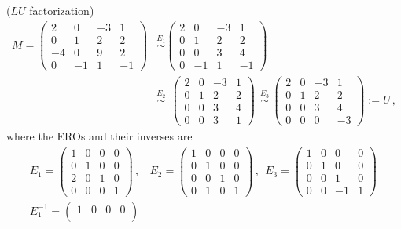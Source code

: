 \begin{example}\label{factorize} ($LU$ \hypertarget{elldeeeww}{ factorization})
\begin{align*}
M=
\begin{pmatrix}
2&0&-3&1\\
0&1&2&2\\
-4&0&9&2\\
0&-1&1&-1
\end{pmatrix}
&\stackrel{E_1}{\sim}
\begin{pmatrix}
2&0&-3&1\\
0&1&2&2\\
0&0&3&4\\
0&-1&1&-1
\end{pmatrix}
\\[2mm]
&\stackrel{E_2}{\sim}
~~\begin{pmatrix}
2&0&-3&1\\
0&1&2&2\\
0&0&3&4\\
0&0&3&1
\end{pmatrix}
~~\stackrel{E_3}{\sim}~
\begin{pmatrix}
2&0&-3&1\\
0&1&2&2\\
0&0&3&4\\
0&0&0&-3
\end{pmatrix}
:=U\, ,
\end{align*}
where the EROs and their inverses are 
\begin{gather*}
E_1=
\begin{pmatrix}
1&0&0&0\\
0&1&0&0\\
2&0&1&0\\
0&0&0&1
\end{pmatrix} \, ,~~~~
E_2=
\begin{pmatrix}
1&0&0&0\\
0&1&0&0\\
0&0&1&0\\
0&1&0&1
\end{pmatrix} \, ,~~
E_3=
\begin{pmatrix}
1&0&0&0\\
0&1&0&0\\
0&0&1&0\\
0&0&-1&1
\end{pmatrix} \, 
\\[2mm] %
E_1^{-1}=
\begin{pmatrix}
1&0&0&0\\

\end{pmatrix}
\end{gather*}
\end{example}
